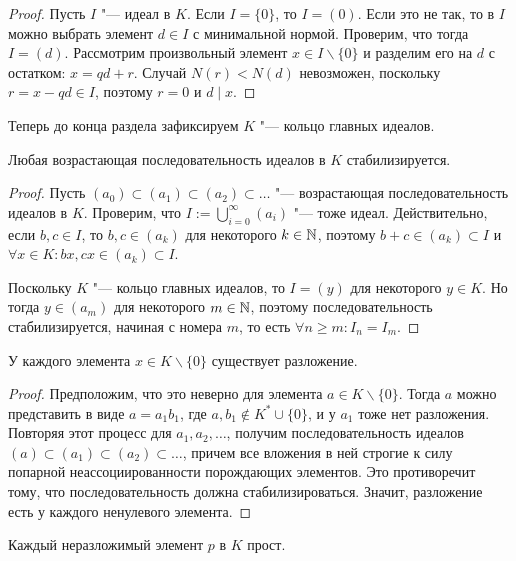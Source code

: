 \begin{proof}
	Пусть $I$ "--- идеал в $K$. Если $I = \{0\}$, то $I = (0)$. Если это не так, то в $I$ можно выбрать элемент $d \in I$ с минимальной нормой. Проверим, что тогда $I = (d)$. Рассмотрим произвольный элемент $x \in I \backslash \{0\}$ и разделим его на $d$ с остатком: $x = qd + r$. Случай $N(r) < N(d)$ невозможен, поскольку $r = x - qd \in I$, поэтому $r = 0$ и $d \mid x$.
\end{proof}

Теперь до конца раздела зафиксируем $K$ "--- кольцо главных идеалов.

\begin{proposition}
	Любая возрастающая последовательность идеалов в $K$ стабилизируется.
\end{proposition}

\begin{proof}
	Пусть $(a_0) \subset (a_1) \subset (a_2) \subset \dotsc$ "--- возрастающая последовательность идеалов в $K$. Проверим, что $I := \bigcup_{i = 0}^\infty (a_i)$ "--- тоже идеал. Действительно, если $b, c \in I$, то $b, c \in (a_k)$ для некоторого $k \in \mathbb{N}$, поэтому $b + c \in (a_k) \subset I$ и $\forall x \in K: bx, cx \in (a_k) \subset I$.
	
	Поскольку $K$ "--- кольцо главных идеалов, то $I = (y)$ для некоторого $y \in K$. Но тогда $y \in (a_m)$ для некоторого $m \in \mathbb{N}$, поэтому последовательность стабилизируется, начиная с номера $m$, то есть $\forall n \ge m: I_n = I_m$.
\end{proof}

\begin{proposition}
	У каждого элемента $x \in K \backslash \{0\}$ существует разложение.
\end{proposition}

\begin{proof}
	Предположим, что это неверно для элемента $a \in K \backslash \{0\}$. Тогда $a$ можно представить в виде $a = a_1b_1$, где $a, b_1 \not\in K^* \cup \{0\}$, и у $a_1$ тоже нет разложения. Повторяя этот процесс для $a_1, a_2, \dotsc$, получим последовательность идеалов $(a) \subset (a_1) \subset (a_2) \subset \dots$, причем все вложения в ней строгие к силу попарной неассоциированности порождающих элементов. Это противоречит тому, что последовательность должна стабилизироваться. Значит, разложение есть у каждого ненулевого элемента.
\end{proof}

\begin{proposition}
	Каждый неразложимый элемент $p$ в $K$ прост.
\end{proposition}

